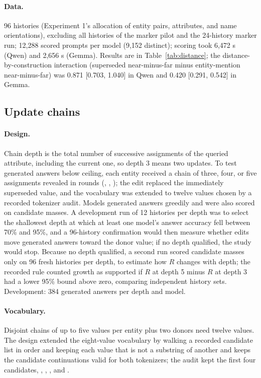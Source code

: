 \paragraph{Data.} 96 histories (Experiment 1's allocation of entity pairs, attributes, and name orientations), excluding all histories of the marker pilot and the 24-history marker run; 12,288 scored prompts per model (9,152 distinct); scoring took 6,472 s (Qwen) and 2,656 s (Gemma). Results are in Table~\ref{tab:distance}; the distance-by-construction interaction (superseded near-minus-far minus entity-mention near-minus-far) was 0.871 [0.703, 1.040] in Qwen and 0.420 [0.291, 0.542] in Gemma.

\subsection{Update chains}

\paragraph{Design.} Chain depth is the total number of successive assignments of the queried attribute, including the current one, so depth 3 means two updates. To test generated answers below ceiling, each entity received a chain of three, four, or five assignments revealed in rounds (, , ); the edit replaced the immediately superseded value, and the vocabulary was extended to twelve values chosen by a recorded tokenizer audit. Models generated answers greedily and were also scored on candidate masses. A development run of 12 histories per depth was to select the shallowest depth at which at least one model's answer accuracy fell between 70\% and 95\%, and a 96-history confirmation would then measure whether edits move generated answers toward the donor value; if no depth qualified, the study would stop. Because no depth qualified, a second run scored candidate masses only on 96 fresh histories per depth, to estimate how $R$ changes with depth; the recorded rule counted growth as supported if $R$ at depth 5 minus $R$ at depth 3 had a lower 95\% bound above zero, comparing independent history sets. Development: 384 generated answers per depth and model.

\paragraph{Vocabulary.} Disjoint chains of up to five values per entity plus two donors need twelve values. The design extended the eight-value vocabulary by walking a recorded candidate list in order and keeping each value that is not a substring of another and keeps the candidate continuations valid for both tokenizers; the audit kept the first four candidates, , , , and .

